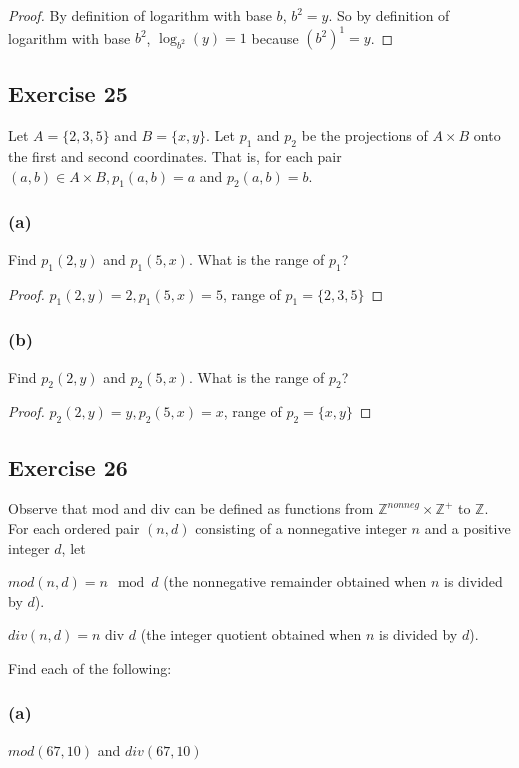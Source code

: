 \documentclass[14pt]{extarticle}
\newcommand{\Z}{\mathbb{Z}}
\begin{document}
\begin{proof}
    By definition of logarithm with base $b$, \(b^2 = y\). So
    by definition of logarithm with base $b^2$,
    \(\log_{b^2}(y) = 1\) because \((b^2)^1 = y\).
\end{proof}

\subsection{Exercise 25}
Let \(A = \{2, 3, 5\}\) and \(B = \{x, y\}\). Let $p_1$ and $p_2$ be the projections of \(A \times B\) onto the first
and second coordinates. That is, for each pair \((a, b) \in A \times B, p_1(a, b) = a\) and \(p_2(a, b) = b\).

\subsubsection{(a)}
Find \(p_1(2, y)\) and \(p_1(5, x)\). What is the range of $p_1$?

\begin{proof}
    \(p_1(2, y) = 2, p_1(5, x) = 5\), range of \(p_1 = \{2, 3, 5\}\)
\end{proof}

\subsubsection{(b)}
Find \(p_2(2, y)\) and \(p_2(5, x)\). What is the range of $p_2$?

\begin{proof}
    \(p_2(2, y) = y, p_2(5, x) = x\), range of \(p_2 = \{x, y\}\)
\end{proof}

\subsection{Exercise 26}
Observe that mod and div can be defined as functions from \(\Z^{nonneg} \times \Z^+\) to $\Z$. For each ordered pair
\((n, d)\) consisting of a nonnegative integer $n$ and a positive integer $d$, let

\(mod(n, d) = n \mod d\) (the nonnegative remainder obtained when $n$ is divided by $d$).

\(div(n, d) = n \text{ div } d\) (the integer quotient obtained when $n$ is divided by $d$).

Find each of the following:

\subsubsection{(a)}
\(mod(67, 10)\) and \(div(67, 10)\)
\end{document}
